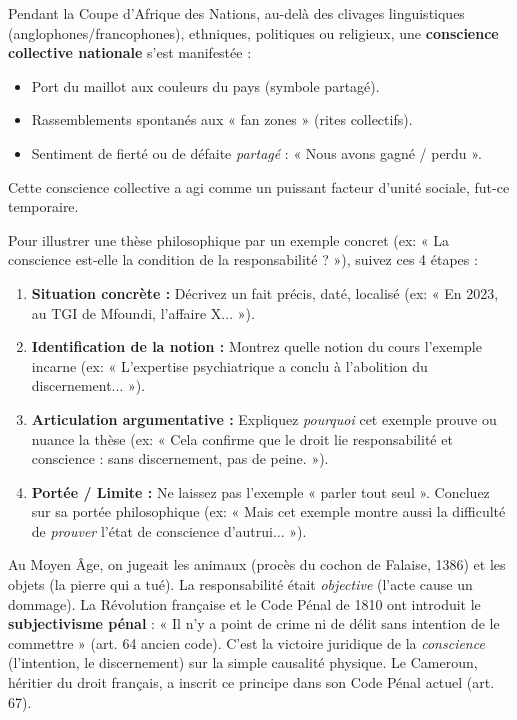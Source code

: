 \documentclass[11pt]{article}
\begin{document}
\begin{exemplebox}
Pendant la Coupe d'Afrique des Nations, au-delà des clivages linguistiques (anglophones/francophones), ethniques, politiques ou religieux, une \textbf{conscience collective nationale} s'est manifestée :
\begin{itemize}
    \item Port du maillot aux couleurs du pays (symbole partagé).
    \item Rassemblements spontanés aux « fan zones » (rites collectifs).
    \item Sentiment de fierté ou de défaite \emph{partagé} : « Nous avons gagné / perdu ».
\end{itemize}
Cette conscience collective a agi comme un puissant facteur d'unité sociale, fut-ce temporaire.
\end{exemplebox}

\begin{methode}
Pour illustrer une thèse philosophique par un exemple concret (ex: « La conscience est-elle la condition de la responsabilité ? »), suivez ces 4 étapes :
\begin{enumerate}
    \item \textbf{Situation concrète :} Décrivez un fait précis, daté, localisé (ex: « En 2023, au TGI de Mfoundi, l'affaire X... »).
    \item \textbf{Identification de la notion :} Montrez quelle notion du cours l'exemple incarne (ex: « L'expertise psychiatrique a conclu à l'abolition du discernement... »).
    \item \textbf{Articulation argumentative :} Expliquez \emph{pourquoi} cet exemple prouve ou nuance la thèse (ex: « Cela confirme que le droit lie responsabilité et conscience : sans discernement, pas de peine. »).
    \item \textbf{Portée / Limite :} Ne laissez pas l'exemple « parler tout seul ». Concluez sur sa portée philosophique (ex: « Mais cet exemple montre aussi la difficulté de \emph{prouver} l'état de conscience d'autrui... »).
\end{enumerate}
\end{methode}

\begin{savaistu}
Au Moyen Âge, on jugeait les animaux (procès du cochon de Falaise, 1386) et les objets (la pierre qui a tué). La responsabilité était \emph{objective} (l'acte cause un dommage). La Révolution française et le Code Pénal de 1810 ont introduit le \textbf{subjectivisme pénal} : « Il n'y a point de crime ni de délit sans intention de le commettre » (art. 64 ancien code). C'est la victoire juridique de la \emph{conscience} (l'intention, le discernement) sur la simple causalité physique. Le Cameroun, héritier du droit français, a inscrit ce principe dans son Code Pénal actuel (art. 67).
\end{savaistu}
\end{document}
